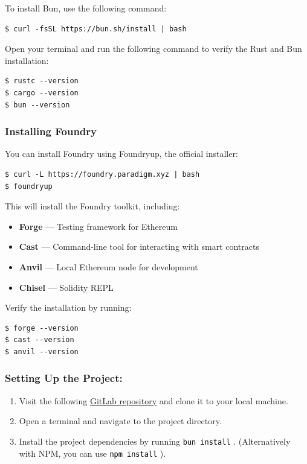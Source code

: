 \documentclass[12pt]{article}
\newcommand{\codegrey}[1]{%
  \texttt{\colorbox{black!4}{\textcolor{black}{#1}}}%
}
\begin{document}
\noindent
To install Bun, use the following command:
\begin{verbatim}
$ curl -fsSL https://bun.sh/install | bash
\end{verbatim}

\noindent
Open your terminal and run the following command to verify the Rust and Bun installation:

\begin{verbatim}
$ rustc --version
$ cargo --version
$ bun --version
\end{verbatim}

\subsubsection*{Installing Foundry}
You can install Foundry using Foundryup, the official installer:

\begin{verbatim}
$ curl -L https://foundry.paradigm.xyz | bash
$ foundryup
\end{verbatim}

\noindent
This will install the Foundry toolkit, including:
\begin{itemize}
    \item \textbf{Forge} --- Testing framework for Ethereum
    \item \textbf{Cast} --- Command-line tool for interacting with smart contracts
    \item \textbf{Anvil} --- Local Ethereum node for development
    \item \textbf{Chisel} --- Solidity REPL
\end{itemize}

\noindent
Verify the installation by running:

\begin{verbatim}
$ forge --version
$ cast --version
$ anvil --version
\end{verbatim}

\subsubsection*{Setting Up the Project:}

\begin{enumerate}
    \item Visit the following
          \href{https://gitlab.fel.cvut.cz/radovluk/smart-contracts-exercises/-/tree/main/09-Vulnerabilities-Detection/task/task-code}{GitLab
          repository} and clone it to your local machine.
    \item Open a terminal and navigate to the project directory.
    \item Install the project dependencies by running \codegrey{bun install}. (Alternatively with NPM, you can use \codegrey{npm install}).
\end{enumerate}
\end{document}
